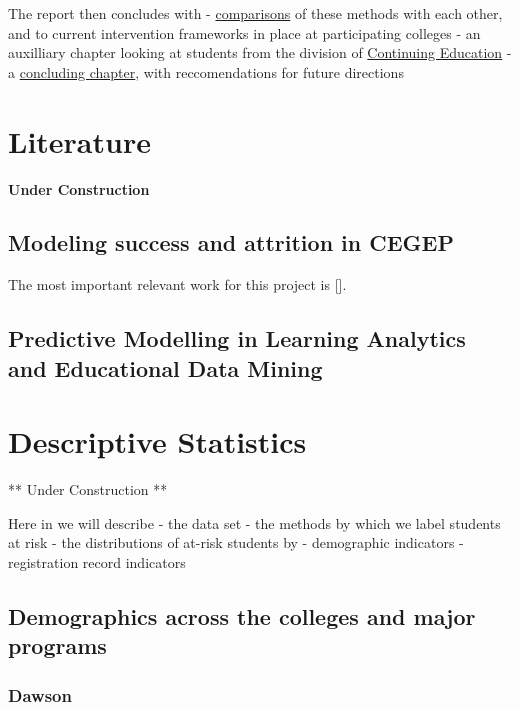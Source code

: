 \documentclass[]{book}
\theoremstyle{definition}
\theoremstyle{definition}
\theoremstyle{remark}
\begin{document}
The report then concludes with -
\protect\hyperlink{comparisons}{comparisons} of these methods with each
other, and to current intervention frameworks in place at participating
colleges - an auxilliary chapter looking at students from the division
of \protect\hyperlink{conted}{Continuing Education} - a
\protect\hyperlink{conclusion}{concluding chapter}, with reccomendations
for future directions

\hypertarget{littreview}{\chapter{Literature}\label{littreview}}

\textbf{Under Construction }

\section{Modeling success and attrition in
CEGEP}\label{modeling-success-and-attrition-in-cegep}

The most important relevant work for this project is
{[}\citep{jorgensen2009pareafinalreport}{]}.

\section{Predictive Modelling in Learning Analytics and Educational Data
Mining}\label{predictive-modelling-in-learning-analytics-and-educational-data-mining}

\citep{hla2017}

\hypertarget{descriptive}{\chapter{Descriptive
Statistics}\label{descriptive}}

** Under Construction **

Here in we will describe - the data set - the methods by which we label
students at risk - the distributions of at-risk students by -
demographic indicators - registration record indicators

\section{Demographics across the colleges and major
programs}\label{demographics-across-the-colleges-and-major-programs}

\subsection{Dawson}\label{dawson}
\end{document}
